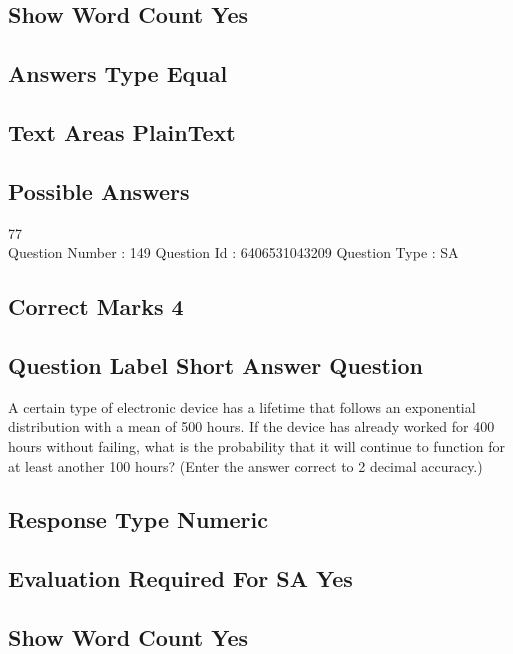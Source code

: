 \documentclass{article}
\begin{document}
\subsection{Show Word Count  Yes}

\subsection{Answers Type  Equal}

\subsection{Text Areas  PlainText}

\subsection{Possible Answers }

77\\

Question Number : 149 Question Id : 6406531043209 Question Type : SA\\

\subsection{Correct Marks  4}

\subsection{Question Label  Short Answer Question}

A certain type of electronic device has a lifetime that follows an exponential distribution with a 
mean of 500 hours. If the device has already worked for 400 hours without failing, what is the 
probability that it will continue to function for at least another 100 hours? (Enter the answer 
correct to 2 decimal accuracy.)\\

\subsection{Response Type  Numeric}

\subsection{Evaluation Required For SA  Yes}

\newpage
\subsection{Show Word Count  Yes}
\end{document}
